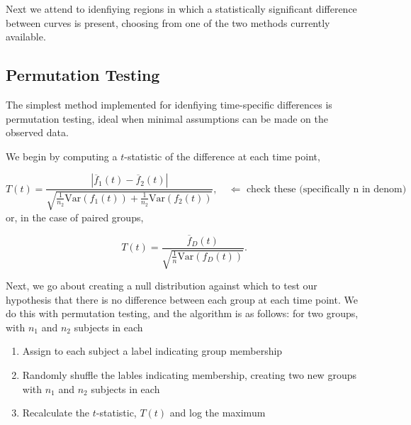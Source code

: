 \documentclass{article}
\begin{document}

Next we attend to idenfiying regions in which a statistically significant difference between curves is present, choosing from one of the two methods currently available.

\subsection{Permutation Testing}

The simplest method implemented for idenfiying time-specific differences is permutation testing, ideal when minimal assumptions can be made on the observed data. 

We begin by computing a $t$-statistic of the difference at each time point, 

\begin{equation}
T(t) = \frac{|\overline{f}_1(t) - \overline{f}_2(t)|}{\sqrt{\frac{1}{n_2} \text{Var}(f_1(t)) + \frac{1}{n_2} \text{Var}(f_2(t))}}, \quad \Leftarrow \text{ check these (specifically n in denom)}
\end{equation}
or, in the case of paired groups, 

\begin{equation}
T(t) = \frac{\overline{f}_D(t)}{\sqrt{\frac1n \text{Var}(f_D(t))}}.
\end{equation}

Next, we go about creating a null distribution against which to test our hypothesis that there is no difference between each group at each time point. We do this with permutation testing, and the algorithm is as follows: for two groups, with $n_1$ and $n_2$ subjects in each

\begin{enumerate}
	\item Assign to each subject a label indicating group membership
	\item Randomly shuffle the lables indicating membership, creating two new groups with $n_1$ and $n_2$ subjects in each
	\item Recalculate the $t$-statistic, $T(t)$ and log the maximum
\end{enumerate}
\end{document}

